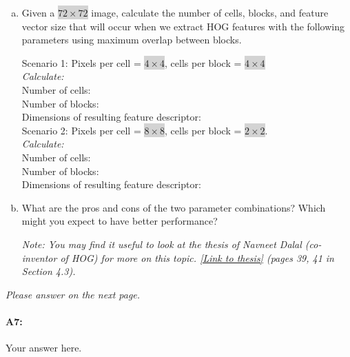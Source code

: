 \begin{enumerate}[(a)]
\item Given a \colorbox{lightgray}{$72\times72$} image, calculate the number of cells, blocks, and feature vector size that will occur when we extract HOG features with the following parameters using maximum overlap between blocks.

Scenario 1: Pixels per cell = \colorbox{lightgray}{$4\times4$}, cells per block = \colorbox{lightgray}{$4\times4$} %
\\
\emph{Calculate:}
\\ 
Number of cells: 
\\
Number of blocks: 
\\
Dimensions of resulting feature descriptor: 
\\

Scenario 2: Pixels per cell = \colorbox{lightgray}{$8\times8$}, cells per block = \colorbox{lightgray}{$2\times2$}.
\\
\emph{Calculate:}
\\ 
Number of cells:
\\
Number of blocks: 
\\
Dimensions of resulting feature descriptor: 


\item What are the pros and cons of the two parameter combinations? Which might you expect to have better performance?

\emph{Note: You may find it useful to look at the thesis of Navneet Dalal (co-inventor of HOG) for more on this topic. \href{http://lear.inrialpes.fr/people/dalal/NavneetDalalThesis.pdf}{[Link to thesis]} (pages 39, 41 in Section 4.3).}

\end{enumerate}

\emph{Please answer on the next page.}


\pagebreak
\paragraph{A7:} Your answer here.



